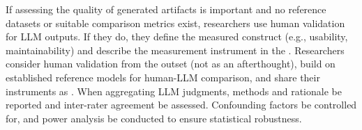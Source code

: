 If assessing the quality of generated artifacts is important and no reference datasets or suitable comparison metrics exist, researchers \should use human validation for LLM outputs. If they do, they \must define the measured construct (e.g., usability, maintainability) and describe the measurement instrument in the \paper. Researchers \should consider human validation from the outset (not as an afterthought), build on established reference models for human-LLM comparison, and share their instruments as \supplementarymaterial. When aggregating LLM judgments, methods and rationale \should be reported and inter-rater agreement \should be assessed. Confounding factors \should be controlled for, and power analysis \should be conducted to ensure statistical robustness.
